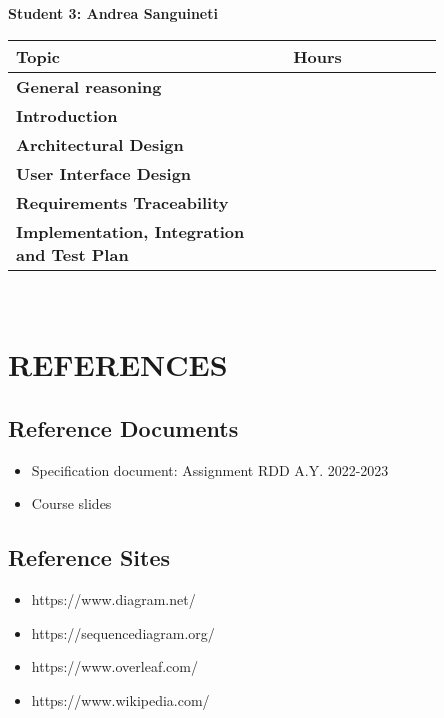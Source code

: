 \textbf {Student 3: Andrea Sanguineti}
\begin{table}[H]
\centering 
    \begin{tabular}{| p{0.55\linewidth} | p{0.30\linewidth} |}
    \hline
    \rowcolor{bluepoli!40}
    \textbf{Topic} & \textbf{Hours}\T\B \\    
    \hline \hline
    \textbf{General reasoning} & \T\B \\
    \hline 
    \textbf{Introduction} & \T\B \\
    \hline 
    \textbf{Architectural Design} & \T\B \\
    \hline 
    \textbf{User Interface Design} & \T\B \\
    \hline 
    \textbf{Requirements Traceability} &  \T\B \\
    \hline
    \textbf{Implementation, Integration and Test Plan} &  \T\B \\
    \hline
    \end{tabular}
    \\[10pt]
\end{table}


\chapter{REFERENCES}
\label{ch:references}%
\section{Reference Documents}
\begin{itemize}
  \item Specification document: Assignment RDD A.Y. 2022-2023
  \item Course slides
\end{itemize}

\section{Reference Sites}
\begin{itemize}
    \item https://www.diagram.net/
    \item https://sequencediagram.org/
    \item https://www.overleaf.com/
    \item https://www.wikipedia.com/
\end{itemize}